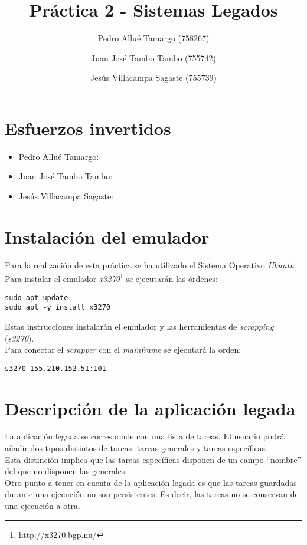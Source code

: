\documentclass[10pt,a4paper]{article}
\begin{document}
\begin{titlepage}
\title{\textbf{{\Huge Práctica 2 - Sistemas Legados}}}
\author{
	Pedro Allué Tamargo (758267)
	\and
	Juan José Tambo Tambo (755742)
	\and
	Jesús Villacampa Sagaste (755739)
}
\clearpage\maketitle
\thispagestyle{empty}
\tableofcontents
\end{titlepage}

\section{Esfuerzos invertidos}

\begin{itemize}
\item Pedro Allué Tamargo:
\item Juan José Tambo Tambo:
\item Jesús Villacampa Sagaste:
\end{itemize}

\section{Instalación del emulador}

Para la realización de esta práctica se ha utilizado el Sistema Operativo \emph{Ubuntu}. Para instalar el emulador \emph{x3270}\footnote{\url{http://x3270.bgp.nu/}} se ejecutarán las órdenes:

\begin{lstlisting}
sudo apt update
sudo apt -y install x3270
\end{lstlisting}

Estas instrucciones instalarán el emulador y las herramientas de \emph{scrapping} (\emph{s3270}).\\

Para conectar el \emph{scrapper} con el \emph{mainframe} se ejecutará la orden:

\begin{lstlisting}
s3270 155.210.152.51:101
\end{lstlisting}


\section{Descripción de la aplicación legada}

La aplicación legada se corresponde con una lista de tareas. El usuario podrá añadir dos tipos distintos de tareas: tareas generales y tareas específicas.\\
Esta distinción implica que las tareas específicas disponen de un campo ``nombre'' del que no disponen las generales.\\
Otro punto a tener en cuenta de la aplicación legada es que las tareas guardadas durante una ejecución no son persistentes. Es decir, las tareas no se conservan de una ejecución a otra.
\end{document}

